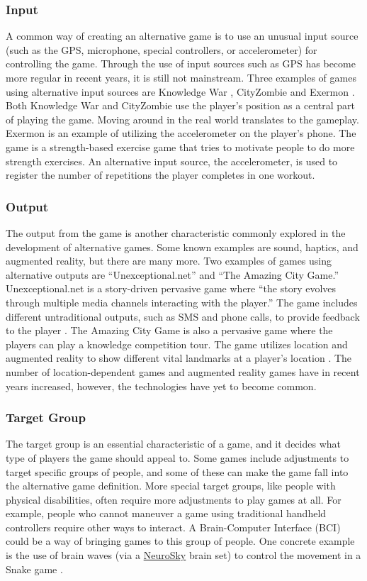 \documentclass[../Main.tex]{subfiles}
\begin{document}
\subsubsection{Input}
A common way of creating an alternative game is to use an unusual input source (such as the GPS, microphone, special controllers, or accelerometer) for controlling the game. Through the use of input sources such as GPS has become more regular in recent years, it is still not mainstream. Three examples of games using alternative input sources are Knowledge War \citep{wang_knowledge_2016}, CityZombie \citep{zhu_experiences_2010} and Exermon \citep{wang_evaluation_2017}. Both Knowledge War and CityZombie use the player’s position as a central part of playing the game. Moving around in the real world translates to the gameplay. Exermon is an example of utilizing the accelerometer on the player's phone. The game is a strength-based exercise game that tries to motivate people to do more strength exercises. An alternative input source, the accelerometer, is used to register the number of repetitions the player completes in one workout. 

\subsubsection{Output}
The output from the game is another characteristic commonly explored in the development of alternative games. Some known examples are sound, haptics, and augmented reality, but there are many more. Two examples of games using alternative outputs are “Unexceptional.net” and “The Amazing City Game.” Unexceptional.net is a story-driven pervasive game where “the story evolves through multiple media channels interacting with the player.” The game includes different untraditional outputs, such as SMS and phone calls, to provide feedback to the player \citep{wang_unexceptionalnet_2009}. The Amazing City Game is also a pervasive game where the players can play a knowledge competition tour. The game utilizes location and augmented reality to show different vital landmarks at a player’s location \citep{wang_pervasive_2011}. The number of location-dependent games and augmented reality games have in recent years increased, however, the technologies have yet to become common. 

\subsubsection{Target Group}
The target group is an essential characteristic of a game, and it decides what type of players the game should appeal to. Some games include adjustments to target specific groups of people, and some of these can make the game fall into the alternative game definition. More special target groups, like people with physical disabilities, often require more adjustments to play games at all. For example, people who cannot maneuver a game using traditional handheld controllers require other ways to interact. A Brain-Computer Interface (BCI) could be a way of bringing games to this group of people. One concrete example is the use of brain waves (via a \href{www.neurosky.com}{NeuroSky} brain set) to control the movement in a Snake game \citep{wang_using_2012}.
\end{document}
